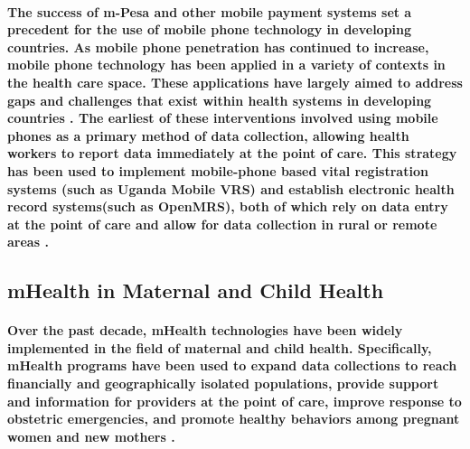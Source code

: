 \paragraph{The success of m-Pesa and other mobile payment systems set a precedent for the use of mobile phone technology in developing countries. As mobile phone penetration has continued to increase, mobile phone technology has been applied in a variety of contexts in the health care space. These applications have largely aimed to address gaps and challenges that exist within health systems in developing countries \citep{Labrique2013}. The earliest of these interventions involved using mobile phones as a primary method of data collection, allowing health workers to report data immediately at the point of care. This strategy has been used to implement mobile-phone based vital registration systems (such as Uganda Mobile VRS) and establish electronic health record systems(such as OpenMRS), both of which rely on data entry at the point of care and allow for data collection in rural or remote areas \citep{Labrique2013}.}

\subsection{mHealth in Maternal and Child Health}
\paragraph{Over the past decade, mHealth technologies have been widely implemented in the field of maternal and child health. Specifically, mHealth programs have been used to expand data collections to reach financially and geographically isolated populations, provide support and information for providers at the point of care, improve response to obstetric emergencies, and promote healthy behaviors among pregnant women and new mothers \citep{Tamrat2012}.}

